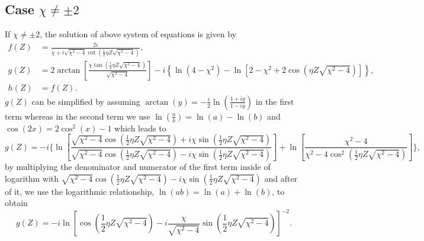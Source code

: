 \documentclass[12pt]{article}
\numberwithin{equation}{section}
\begin{document}
\subsection{Case $\chi\neq \pm 2$}
If $\chi\neq\pm 2$, the solution of above system of equations is given by  
\begin{subequations}\label{ap03}
	\begin{align}
f(Z)&=\frac{2 i}{\chi +i \sqrt{\chi ^2-4} \cot \left(\frac{1}{2} \eta Z \sqrt{\chi ^2-4} \right)},
\\
g(Z)&=2 \arctan \left[\frac{\chi  \tan \left(\frac{1}{2} \eta Z \sqrt{\chi ^2-4} \right)}{\sqrt{\chi ^2-4}}\right]
-i \left\lbrace \ln \left(4-\chi ^2\right)-\ln \left[2-\chi ^2+2 \cos \left(\eta Z \sqrt{\chi ^2-4} \right)\right]\right\rbrace,
\\
h(Z)&=f(Z).
\end{align}
\end{subequations}
$g(Z)$ can be simplified by assuming $\arctan(y)=-\frac{i}{2} \ln (\frac{1+iy}{1-iy})$ in the first term whereas in the second term we use $\ln\left(\frac{a}{b}\right)=\ln(a)-\ln(b)$ and $\cos(2 x)=2\cos^2(x)-1$ which leads to
\begin{equation} \label{ap04}
g(Z)=-i \Bigg\lbrace  \ln \left[\frac{\sqrt{\chi ^2-4} \cos \left(\frac{1}{2} \eta Z \sqrt{\chi ^2-4} \right) + i \chi  \sin \left(\frac{1}{2} \eta Z \sqrt{\chi ^2-4} \right) }{ \sqrt{\chi ^2-4} \cos \left(\frac{1}{2} \eta Z \sqrt{\chi ^2-4} \right) -i \chi  \sin \left(\frac{1}{2} \eta Z \sqrt{\chi ^2-4} \right) } \right]  +  \ln \left[\frac{\chi^2-4}{\chi^2-4 \cos^2 \left(\frac{1}{2} \eta Z \sqrt{\chi ^2-4} \right)}\right]   \Bigg\rbrace,
\end{equation}
by multiplying the denominator and numerator of the first term inside of logarithm with $\sqrt{\chi ^2-4} \cos \left(\frac{1}{2} \eta Z \sqrt{\chi ^2-4} \right) -i \chi  \sin \left(\frac{1}{2} \eta Z \sqrt{\chi ^2-4} \right)$ and after of it, we use the logarithmic relationship, $\ln\left(a b\right)=\ln(a)+\ln(b)$, to obtain
\begin{equation} \label{ap05}
g(Z)=-i \ln  \left[\cos \left(\frac{1}{2} \eta Z \sqrt{\chi ^2-4} \right) -i \frac{\chi}{\sqrt{\chi ^2-4}}   \sin \left(\frac{1}{2} \eta Z \sqrt{\chi ^2-4} \right)\right]^{-2}.
\end{equation}
\end{document}
